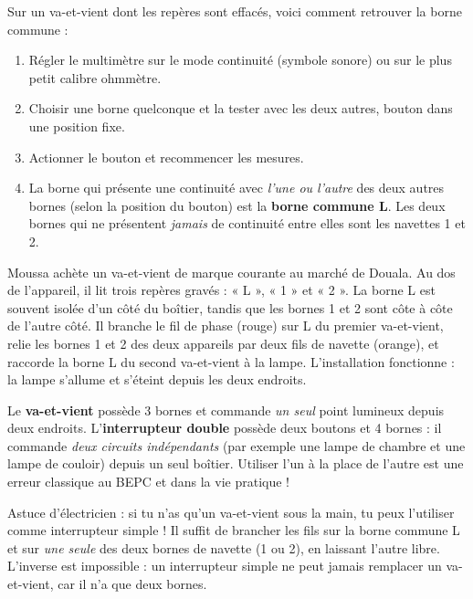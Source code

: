 \documentclass[11pt]{article}
\begin{document}
\begin{methode}
Sur un va-et-vient dont les repères sont effacés, voici comment retrouver la borne commune :
\begin{enumerate}
\item Régler le multimètre sur le mode continuité (symbole sonore) ou sur le plus petit calibre ohmmètre.
\item Choisir une borne quelconque et la tester avec les deux autres, bouton dans une position fixe.
\item Actionner le bouton et recommencer les mesures.
\item La borne qui présente une continuité avec \emph{l'une ou l'autre} des deux autres bornes (selon la position du bouton) est la \textbf{borne commune L}. Les deux bornes qui ne présentent \emph{jamais} de continuité entre elles sont les navettes 1 et 2.
\end{enumerate}
\end{methode}

\begin{exemplebox}
Moussa achète un va-et-vient de marque courante au marché de Douala. Au dos de l'appareil, il lit trois repères gravés : « L », « 1 » et « 2 ». La borne L est souvent isolée d'un côté du boîtier, tandis que les bornes 1 et 2 sont côte à côte de l'autre côté. Il branche le fil de phase (rouge) sur L du premier va-et-vient, relie les bornes 1 et 2 des deux appareils par deux fils de navette (orange), et raccorde la borne L du second va-et-vient à la lampe. L'installation fonctionne : la lampe s'allume et s'éteint depuis les deux endroits.
\end{exemplebox}

\begin{attention}
Le \textbf{va-et-vient} possède 3 bornes et commande \emph{un seul} point lumineux depuis deux endroits. L'\textbf{interrupteur double} possède deux boutons et 4 bornes : il commande \emph{deux circuits indépendants} (par exemple une lampe de chambre et une lampe de couloir) depuis un seul boîtier. Utiliser l'un à la place de l'autre est une erreur classique au BEPC et dans la vie pratique !
\end{attention}

\begin{savaistu}
Astuce d'électricien : si tu n'as qu'un va-et-vient sous la main, tu peux l'utiliser comme interrupteur simple ! Il suffit de brancher les fils sur la borne commune L et sur \emph{une seule} des deux bornes de navette (1 ou 2), en laissant l'autre libre. L'inverse est impossible : un interrupteur simple ne peut jamais remplacer un va-et-vient, car il n'a que deux bornes.
\end{savaistu}
\end{document}
